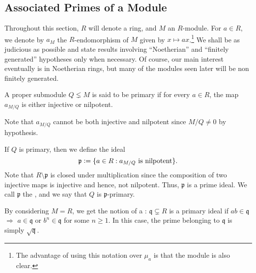 \subsection{Associated Primes of a Module} \label{subsec:associated-primes}

Throughout this section, $R$ will denote a ring, and $M$ an $R$-module. For $a \in R$, we denote by $a_{M}$ the $R$-endomorphism of $M$ given by $x \mapsto ax$.\footnote{The advantage of using this notation over $\mu_{a}$ is that the module is also clear.} We shall be as judicious as possible and state results involving ``Noetherian'' and ``finitely generated'' hypotheses only when necessary. Of course, our main interest eventually is in Noetherian rings, but many of the modules seen later will be non finitely generated.

\begin{defn}
	A proper submodule $Q \lneq M$ is said to be primary if for every $a \in R$, the map $a_{M/Q}$ is either injective or nilpotent.
\end{defn}

Note that $a_{M/Q}$ cannot be both injective and nilpotent since $M/Q \neq 0$ by hypothesis.

If $Q$ is primary, then we define the ideal
\begin{equation*} 
	\mathfrak{p} \vcentcolon= \{a \in R : a_{M/Q} \text{ is nilpotent}\}.
\end{equation*}
Note that $R \setminus \mathfrak{p}$ is closed under multiplication since the composition of two injective maps is injective and hence, not nilpotent. Thus, $\mathfrak{p}$ is a prime ideal. We call $\mathfrak{p}$ the , and we say that $Q$ is $\mathfrak{p}$-primary.

By considering $M = R$, we get the notion of a : $\mathfrak{q} \subsetneq R$ is a primary ideal if $ab \in \mathfrak{q}$ $\Rightarrow$ $a \in \mathfrak{q}$ or $b^{n} \in \mathfrak{q}$ for some $n \ge 1$. In this case, the prime belonging to $\mathfrak{q}$ is simply $\sqrt{\mathfrak{q}}$.

